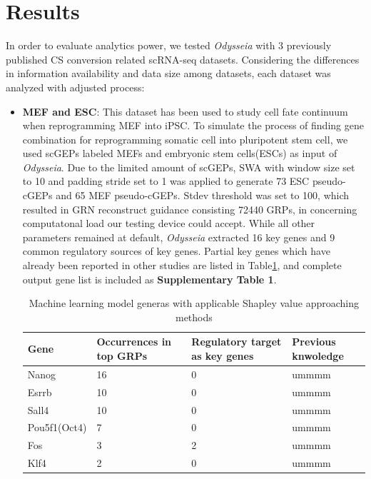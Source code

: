 \documentclass[fleqn,10pt]{wlscirep}
\begin{document}
\section*{Results}
\label{res}
In order to evaluate analytics power, we tested \emph{Odysseia} with 3 previously published CS conversion related scRNA-seq datasets.
Considering the differences in information availability and data size among datasets, each dataset was analyzed with adjusted process:
\begin{itemize}
\setlength\itemsep{0em}
\item \textbf{MEF and ESC}:
This dataset has been used to study cell fate continuum when reprogramming MEF into iPSC.\cite{mef_ipsc_cas}
To simulate the process of finding gene combination for reprogramming somatic cell into pluripotent stem cell, we used scGEPs labeled MEFs and embryonic stem cells(ESCs) as input of \emph{Odysseia}.
Due to the limited amount of scGEPs, SWA with window size set to 10 and padding stride set to 1 was applied to generate 73 ESC pseudo-cGEPs and 65 MEF pseudo-cGEPs.
Stdev threshold was set to 100, which resulted in GRN reconstruct guidance consisting 72440 GRPs, in concerning computatonal load our testing device could accept.
While all other parameters remained at default, \emph{Odysseia} extracted 16 key genes and 9 common regulatory sources of key genes.
Partial key genes which have already been reported in other studies are listed in Table\ref{mef_ips_table}, and complete output gene list is included as \textbf{Supplementary Table 1}.

\begin{table}[ht]
\centering
\begin{tabular}{|l|l|l|l|}
\hline
\textbf{Gene} & \textbf{Occurrences in top GRPs} & \textbf{Regulatory target as key genes} & \textbf{Previous knwoledge}  \\
\hline
Nanog & 16 & 0 & ummmm \\
\hline
Esrrb & 10 & 0 & ummmm \\
\hline
Sall4 & 10 & 0 & ummmm \\
\hline
Pou5f1(Oct4) & 7 & 0 & ummmm \\
\hline
Fos & 3 & 2 & ummmm \\
\hline
Klf4 & 2 & 0 & ummmm \\
\hline
\end{tabular}
\caption{\label{mef_ips_table}Machine learning model generas with applicable Shapley value approaching methods}
\end{table}


\end{itemize}
\end{document}
